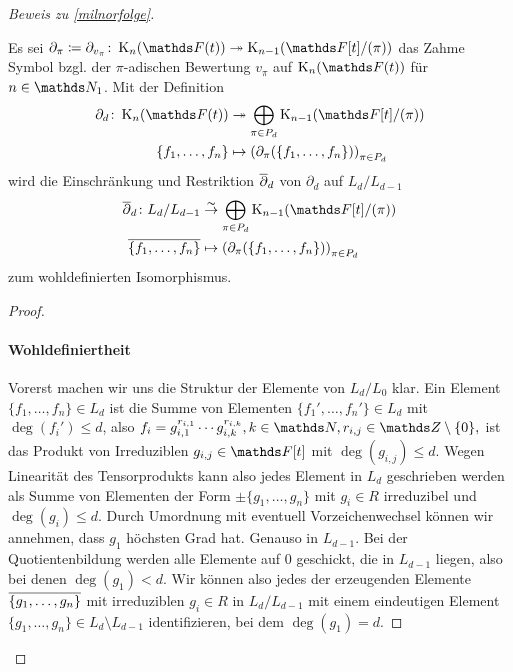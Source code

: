 \documentclass[ngerman,fontsize=11pt, paper=a4, parskip=half, titlepage=true, toc=bib]{scrartcl}
\begin{document}
\begin{proof}[Beweis zu \ref{milnorfolge}]
  \begin{Lem}[\ref{2}]
    Es sei $\partial_\pi\coloneqq \partial_{v_\pi}\colon
    \KnFt\twoheadrightarrow\K_{n-1}(\Ftpi)$
    das Zahme Symbol bzgl. der $\pi$-adischen Bewertung $v_\pi$ auf
    $\KnFt$ für $n\in\N_1$.
    Mit der Definition
    \begin{align*}
      \partial_d\colon \KnFt
      &\twoheadrightarrow \bigoplus_{\pi\in
        P_d}\K_{n-1}(\Ftpi)\\
      \{f_1,\dotsc,f_n\}
      &\mapsto\left(
        \partial_\pi(\{f_1,\dotsc,f_n\})
        \right)_{\pi\in P_d}
    \end{align*}
    wird die Einschränkung und Restriktion $\overline{\partial}_d$ 
    von $\partial_d$ auf $L_d/L_{d-1}$
    \begin{align*}
      \ov{\partial}_d\colon L_d/L_{d-1}
      &\overset{\thicksim}{\rightarrow} \bigoplus_{\pi\in
        P_d}\K_{n-1}(\Ftpi)\\
      \ov{\{f_1,\dotsc,f_n\}}
      &\mapsto\left(
        \partial_\pi(\{f_1,\dotsc,f_n\})
        \right)_{\pi\in P_d}
    \end{align*}
    zum wohldefinierten Isomorphismus.
  \end{Lem}
  \begin{proof}
    \paragraph{Wohldefiniertheit}
    Vorerst machen wir uns die Struktur der Elemente von $L_d/L_0$
    klar. Ein Element $\{f_1,\dotsc,f_n\}\in L_d$ ist die Summe von
    Elementen $\{f_1',\dotsc,f_n'\}\in L_d$ mit $\deg(f_i')\leq d$, also
    $f_i=g_{i,1}^{r_{i,1}}\dotsm g_{i,k}^{r_{i,k}}, 
    k\in\N, r_{i,j}\in\Z\setminus \{0\},$ ist das Produkt von 
    Irreduziblen $g_{i,j}\in\F[t]$ mit $\deg(g_{i,j})\leq d$.
    Wegen Linearität des Tensorprodukts kann also jedes Element in
    $L_d$ geschrieben werden als Summe von Elementen der Form
    $\pm\{g_1,\dotsc, g_n\}$ mit $g_i\in R$ irreduzibel und
    $\deg(g_i)\leq d$. Durch Umordnung mit eventuell Vorzeichenwechsel
    können wir annehmen, dass $g_1$ höchsten Grad hat.
    Genauso in $L_{d-1}$.
    Bei der Quotientenbildung werden alle Elemente auf $0$
    geschickt, die in $L_{d-1}$ liegen, also bei denen $\deg(g_1)<d$.
    Wir können also jedes der erzeugenden Elemente $\overline{\{g_1,\dotsc,g_n\}}$ 
    mit irreduziblen $g_i\in R$ in $L_d/L_{d-1}$ mit einem
    eindeutigen Element $\{g_1,\dotsc,g_n\}\in L_d\setminus L_{d-1}$
    identifizieren, bei dem $\deg(g_1)=d$.


\end{proof}
\end{proof}
\end{document}
